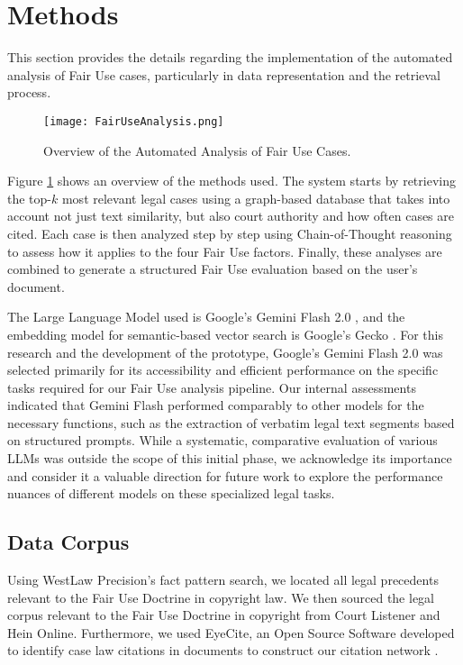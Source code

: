 \section{Methods}
\label{sec: Methods}

This section provides the details regarding the implementation of the automated analysis of Fair Use cases, particularly in data representation and the retrieval process.

\begin{figure}[h]
    \centering
    \texttt{[image: FairUseAnalysis.png]}
    \caption{Overview of the Automated Analysis of Fair Use Cases.}
    \label{fig:fair_use_legal_bot}
\end{figure}

Figure \ref{fig:fair_use_legal_bot} shows an overview
of the methods used. The system starts by retrieving the top-$k$ most relevant legal cases using a graph-based database that takes into account not just text similarity, but also court authority and how often cases are cited. Each case is then analyzed step by step using Chain-of-Thought reasoning to assess how it applies to the four Fair Use factors. Finally, these analyses are combined to generate a structured Fair Use evaluation based on the user’s document.

The Large Language Model used is Google's Gemini Flash 2.0 \cite{11_GeminiLLM}, and the embedding model for semantic-based vector search is Google's Gecko \cite{29_GeckoEmbeddings}. For this research and the development of the prototype, Google's Gemini Flash 2.0 was selected primarily for its accessibility and efficient performance on the specific tasks required for our Fair Use analysis pipeline. Our internal assessments indicated that Gemini Flash performed comparably to other models for the necessary functions, such as the extraction of verbatim legal text segments based on structured prompts. While a systematic, comparative evaluation of various LLMs was outside the scope of this initial phase, we acknowledge its importance and consider it a valuable direction for future work to explore the performance nuances of different models on these specialized legal tasks.

\subsection{Data Corpus}

Using WestLaw Precision's fact pattern search, we located all legal precedents relevant to the Fair Use Doctrine in copyright law. We then sourced the legal corpus relevant to the Fair Use Doctrine in copyright from Court Listener \cite{25_free_law_project_recap_2020} and Hein Online. Furthermore, we used EyeCite, an Open Source Software developed to identify case law citations in documents to construct our citation network \cite{24_eyecite}. 


